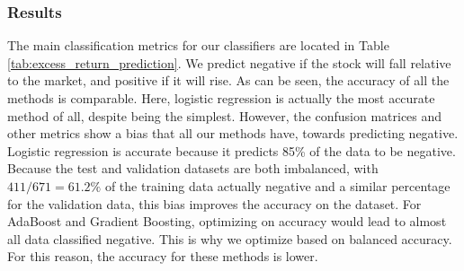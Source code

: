 \documentclass{article}
\begin{document}
\subsubsection{Results}

The main classification metrics for our classifiers are located in Table \ref{tab:excess_return_prediction}.
We predict negative if the stock will fall relative to the market, and positive if it will rise.
As can be seen, the accuracy of all the methods is comparable.
Here, logistic regression is actually the most accurate method of all, despite being the simplest.
However, the confusion matrices and other metrics show a bias that all our methods have, towards predicting negative.
Logistic regression is accurate because it predicts 85\% of the data to be negative.
Because the test and validation datasets are both imbalanced, with $411/671 = 61.2\%$ of the training data actually negative and a similar percentage for the validation data, this bias improves the accuracy on the dataset.
For AdaBoost and Gradient Boosting, optimizing on accuracy would lead to almost all data classified negative.
This is why we optimize based on balanced accuracy.
For this reason, the accuracy for these methods is lower.
\end{document}
